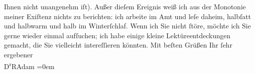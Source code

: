 \begin{ledgroupsized}[t]{13cm}
               Ihnen nicht unangenehm iſt).\pend
           \pstart
           Außer dieſem Ereignis weiß ich aus der Monotonie meiner Exiſtenz nichts zu berichten:
               ich arbeite im Amt und leſe daheim, halbſatt und halbwarm und halb im
               Winterſchlaf.\pend
           \pstart
           Wenn ich Sie nicht ſtöre, möchte ich Sie gerne wieder einmal aufſuchen; ich habe
               einige kleine Lektüreentdeckungen gemacht, die Sie vielleicht intereſſieren
               könnten.\pend
           \pstart
           Mit beſten Grüßen Ihr ſehr{\\[\baselineskip]}ergebener{\\[\baselineskip]}\spacefill\mbox{D\textsuperscript{r}RAdam}\pend
           \leftskip=0em{}
         
         \endnumbering{}\end{ledgroupsized}  \newcommand{\dateiname}{L02319}\newcommand{\titel}{Robert Adam an Arthur Schnitzler, 17. 1. 1919}\newcommand{\editorInnen}{Martin Anton Müller und Gerd-Hermann Susen}
      
